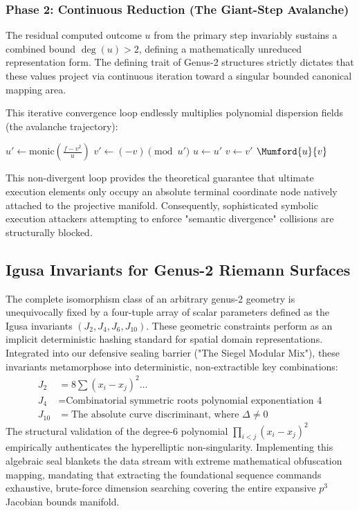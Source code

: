 \subsubsection{Phase 2: Continuous Reduction (The Giant-Step Avalanche)}
The residual computed outcome $u$ from the primary step invariably sustains a combined bound $\deg(u) > 2$, defining a mathematically unreduced representation form. The defining trait of Genus-2 structures strictly dictates that these values project via continuous iteration toward a singular bounded canonical mapping area. 

This iterative convergence loop endlessly multiplies polynomial dispersion fields (the avalanche trajectory):
\begin{algorithm}[H]
\caption{Cantor Reduction Loop (Aggressive Cryptographic Avalanche)}
\begin{algorithmic}[1]
    \State $u' \gets \text{monic}\left( \frac{f - v^2}{u} \right)$
    \State $v' \gets (-v) \pmod{u'}$
    \State $u \gets u'$
    \State $v \gets v'$
\EndWhile
\State \Return $\Mumford{u}{v}$
\end{algorithmic}
\label{alg:cantor_reduction}
\end{algorithm}
This non-divergent loop provides the theoretical guarantee that ultimate execution elements only occupy an absolute terminal coordinate node natively attached to the projective manifold. Consequently, sophisticated symbolic execution attackers attempting to enforce "semantic divergence" collisions are structurally blocked.

\subsection{Igusa Invariants for Genus-2 Riemann Surfaces}
The complete isomorphism class of an arbitrary genus-2 geometry is unequivocally fixed by a four-tuple array of scalar parameters defined as the Igusa invariants $(J_2, J_4, J_6, J_{10})$. These geometric constraints perform as an implicit deterministic hashing standard for spatial domain representations.
Integrated into our defensive sealing barrier ("The Siegel Modular Mix"), these invariants metamorphose into deterministic, non-extractible key combinations:
\begin{align}
    J_2 &= 8 \sum (x_i - x_j)^2 \dots \\
    J_4 &= \text{Combinatorial symmetric roots polynomial exponentiation 4} \\
    J_{10} &= \text{The absolute curve discriminant, where } \Delta \ne 0
\end{align}
The structural validation of the degree-6 polynomial $\prod_{i<j} (x_i - x_j)^2$ empirically authenticates the hyperelliptic non-singularity. Implementing this algebraic seal blankets the data stream with extreme mathematical obfuscation mapping, mandating that extracting the foundational sequence commands exhaustive, brute-force dimension searching covering the entire expansive $p^3$ Jacobian bounds manifold.

